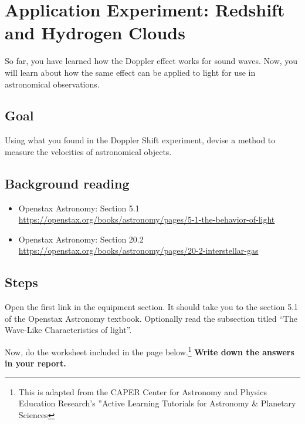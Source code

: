 \section{Application Experiment: Redshift and Hydrogen Clouds}
So far, you have learned how the Doppler effect works for sound waves. Now, you will learn about how the same effect can be applied to light for use in astronomical observations.

\subsection{Goal}
Using what you found in the Doppler Shift experiment, devise a method to measure the velocities of astronomical objects.

\subsection{Background reading}

\begin{itemize}
	\item Openstax Astronomy: Section 5.1 \url{https://openstax.org/books/astronomy/pages/5-1-the-behavior-of-light}
	
	\item Openstax Astronomy: Section 20.2 \url{https://openstax.org/books/astronomy/pages/20-2-interstellar-gas}
\end{itemize}

\subsection{Steps}


\begin{steps}
	\item Open the first link in the equipment section. It should take you to the section 5.1 of the Openstax Astronomy textbook. Optionally read the subsection titled ``The Wave-Like Characteristics of light''. 
	
	\item Now, do the worksheet included in the page below.\footnote{This is adapted from the CAPER Center for Astronomy and Physics Education Research's ''Active Learning Tutorials for Astronomy \& Planetary Sciences} \textbf{Write down the answers in your report.}
	
	\textbf{} %
\end{steps}
	


